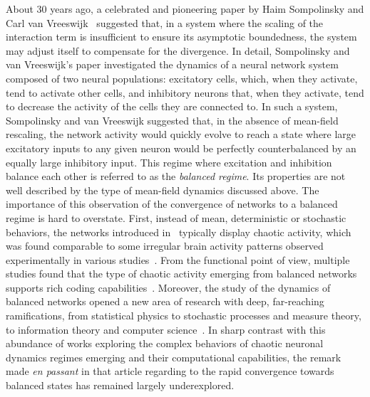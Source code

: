 \documentclass[onefignum,onetabnum]{siamart190516}
\newcommand{\1}{\mathbbm{1}}
\newcommand{\review}[1]{\textcolor{midblue}{ #1}}
\newcommand{\minor}[1]{\textcolor{orange}{ #1}}
\renewcommand{\review}[1]{{ #1}}
\renewcommand{\minor}[1]{{ #1}}
\begin{document}
About 30 years ago, a celebrated and pioneering paper by Haim Sompolinsky and Carl van Vreeswijk~\cite{sompolinsky-van-vreeswijk} \minor{suggested that, in a system where the scaling of the interaction term is insufficient to ensure its asymptotic boundedness, the system may adjust itself to compensate for the divergence. In detail, Sompolinsky and van Vreeswijk's paper investigated the dynamics of a neural network system composed of two neural populations: excitatory cells, which, when they activate, tend to activate other cells, and inhibitory neurons that, when they activate, tend to decrease the activity of the cells they are connected to. In such a system, Sompolinsky and van Vreeswijk suggested that, in the absence of mean-field rescaling, the network activity would quickly evolve to reach a state where large excitatory inputs to any given neuron would be perfectly counterbalanced by an equally large inhibitory input. This regime where excitation and inhibition balance each other is referred to as the \emph{balanced regime}. Its properties are not well described by the type of mean-field dynamics discussed above}.  \review{The importance of this observation of the convergence of networks to a balanced regime is hard to overstate. \minor{First, instead of mean, deterministic or stochastic behaviors, the networks introduced in~\cite{sompolinsky-van-vreeswijk} typically display chaotic activity, which was found comparable to some irregular brain activity patterns observed experimentally in various studies~\cite{Britten:93, Shadlen:98, Compte:03}. From the functional point of view, multiple studies found that the type of chaotic activity emerging from balanced networks supports rich coding capabilities~\cite{sussillo:09, monteforte:12,london:10,kadmon2020predictive,deneve2016efficient}. Moreover, the study of the dynamics of balanced networks opened} a new area of research with deep, far-reaching ramifications, from statistical physics to stochastic processes and measure theory, to information theory and computer science}~\cite{cabana1,cabana2,jahnke2009chaotic,kadmon2020predictive,terada2024chaotic,wainrib2013topological}. In sharp contrast with this abundance of works exploring the complex behaviors of chaotic neuronal dynamics regimes emerging and their computational capabilities, the remark made \emph{en passant} in that article regarding to the rapid convergence towards balanced states has remained largely underexplored. 
\end{document}
